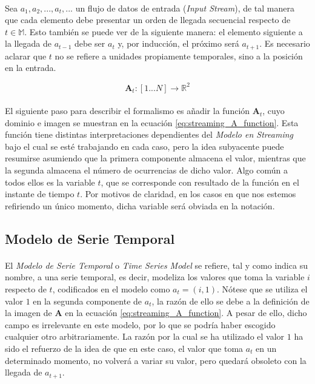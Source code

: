 \documentclass{subfiles}
\begin{document}
        \paragraph{}
        Sea $a_1 ,a_2 ,... ,a_t,... $ un flujo de datos de entrada (\emph{Input Stream}), de tal manera que cada elemento debe presentar un orden de llegada secuencial respecto de $t \in \mathbb{M}$. Esto también se puede ver de la siguiente manera: el elemento siguiente a la llegada de $a_{t-1}$ debe ser $a_{t}$ y, por inducción, el próximo será $a_{t+1}$. Es necesario aclarar que $t$ no se refiere a unidades propiamente temporales, sino a la posición en la entrada.


        \begin{equation}
        \label{eq:streaming_A_function}
          \boldsymbol{A}_t:[1...N] \rightarrow \mathbb{R}^2
        \end{equation}


        \paragraph{}
        El siguiente paso para describir el formalismo es añadir la función $\boldsymbol{A}_t$, cuyo dominio e imagen se muestran en la ecuación \eqref{eq:streaming_A_function}. Esta función tiene distintas interpretaciones dependientes del \emph{Modelo en Streaming} bajo el cual se esté trabajando en cada caso, pero la idea subyacente puede resumirse asumiendo que la primera componente almacena el valor, mientras que la segunda almacena el número de ocurrencias de dicho valor. Algo común a todos ellos es la variable $t$, que se corresponde con resultado de la función en el instante de tiempo $t$. Por motivos de claridad, en los casos en que nos estemos refiriendo un único momento, dicha variable será obviada en la notación.

      \subsection{Modelo de Serie Temporal}
      \label{sec:streaming_time_series}

        \paragraph{}
        El \emph{Modelo de Serie Temporal} o \emph{Time Series Model} se refiere, tal y como indica su nombre, a una serie temporal, es decir, modeliza los valores que toma la variable $i$ respecto de $t$, codificados en el modelo como $a_t = (i,1)$. Nótese que se utiliza el valor $1$ en la segunda componente de $a_t$, la razón de ello se debe a la definición de la imagen de $\boldsymbol{A}$ en la ecuación \eqref{eq:streaming_A_function}. A pesar de ello, dicho campo es irrelevante en este modelo, por lo que se podría haber escogido cualquier otro arbitrariamente. La razón por la cual se ha utilizado el valor $1$ ha sido el refuerzo de la idea de que en este caso, el valor que toma $a_t$ en un determinado momento, no volverá a variar su valor, pero quedará obsoleto con la llegada de $a_{t+1}$.
\end{document}
